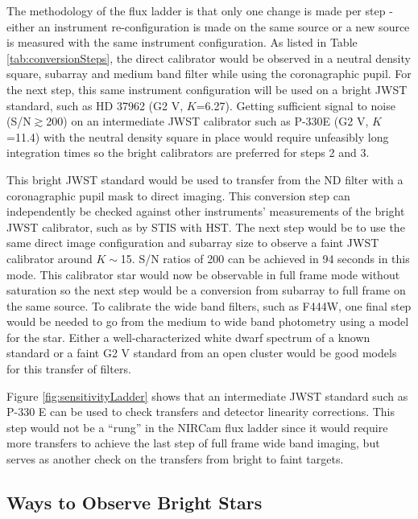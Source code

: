 \documentclass{aastex6}
\begin{document}
The methodology of the flux ladder is that only one change is made per step - either an instrument re-configuration is made on the same source or a new source is measured with the same instrument configuration.
As listed in Table \ref{tab:conversionSteps}, the direct calibrator would be observed in a neutral density square, subarray and medium band filter while using the coronagraphic pupil.
For the next step, this same instrument configuration will be used on a bright JWST standard, such as HD 37962 (G2 V, $K$=6.27).
Getting sufficient signal to noise (S/N$\gtrsim$200) on an intermediate JWST calibrator such as P-330E (G2 V, $K$=11.4) with the neutral density square in place would require unfeasibly long integration times so the bright calibrators are preferred for steps 2 and 3.

This bright JWST standard would be used to transfer from the ND filter with a coronagraphic pupil mask to direct imaging.
This conversion step can independently be checked against other instruments' measurements of the bright JWST calibrator, such as by STIS with HST.
The next step would be to use the same direct image configuration and subarray size to observe a faint JWST calibrator around $K \sim$15.
S/N ratios of 200 can be achieved in 94 seconds in this mode.
This calibrator star would now be observable in full frame mode without saturation so the next step would be a conversion from subarray to full frame on the same source.
To calibrate the wide band filters, such as F444W, one final step would be needed to go from the medium to wide band photometry using a model for the star.
Either a well-characterized white dwarf spectrum of a known standard or a faint G2 V standard from an open cluster would be good models for this transfer of filters.

Figure \ref{fig:sensitivityLadder} shows that an intermediate JWST standard such as P-330 E can be used to check transfers and detector linearity corrections.
This step would not be a ``rung'' in the NIRCam flux ladder since it would require more transfers to achieve the last step of full frame wide band imaging, but serves as another check on the transfers from bright to faint targets.

\subsection{Ways to Observe Bright Stars}\label{sec:brightStarMode}
\end{document}
